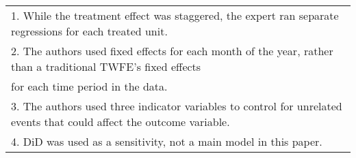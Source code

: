 \begin{table}[htbp]
{\begin{tabular}{lcccc}
\multicolumn{5}{l}{\footnotesize 1. While the treatment effect was staggered, the expert ran separate regressions for each treated unit.} \\
\multicolumn{5}{l}{\footnotesize 2. The authors used fixed effects for each month of the year, rather than a traditional TWFE's fixed effects} \\ 
\multicolumn{5}{l}{\footnotesize \phantom{2. }for each time period in the data.}\\
\multicolumn{5}{l}{\footnotesize 3. The authors used three indicator variables to control for unrelated events that could affect the outcome variable.}\\
\multicolumn{5}{l}{\footnotesize 4. DiD was used as a sensitivity, not a main model in this paper.}\\
\end{tabular}
}
\end{table}
